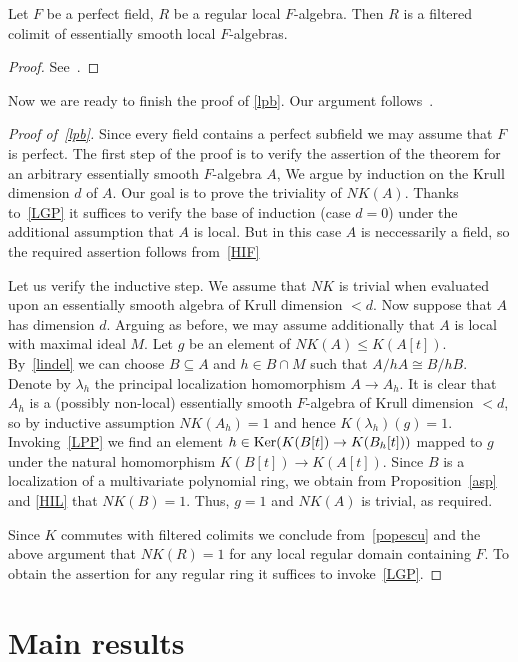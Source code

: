\documentclass[oneside, 11pt]{amsart} \pdfoutput=1
\begin{document}
\begin{theorem}[Popescu]
\label{popescu}
Let $F$ be a perfect field, $R$ be a regular local $F$-algebra. Then $R$ is a filtered colimit of essentially smooth local $F$-algebras.
\end{theorem}
\begin{proof} See~\cite[Corollary~1.3]{Sw98}.%
\end{proof}

Now we are ready to finish the proof of \cref{lpb}. Our argument follows~\cite{Sta14, Vo81}.
\begin{proof}[Proof of~\cref{lpb}]
Since every field contains a perfect subfield we may assume that $F$ is perfect.
The first step of the proof is to verify the assertion of the theorem for an arbitrary essentially smooth $F$-algebra $A$,  %
We argue by induction on the Krull dimension $d$ of $A$. Our goal is to prove the triviality of $NK(A)$.
Thanks to~\cref{LGP} it suffices to verify the base of induction (case $d=0$) under the additional assumption that $A$ is local.
But in this case $A$ is neccessarily a field, so the required assertion follows from~\ref{HIF}

Let us verify the inductive step. We assume that $NK$ is trivial when evaluated upon an essentially smooth algebra of Krull dimension $<d$. Now suppose that $A$ has dimension $d$. Arguing as before, we may assume additionally that $A$ is local with maximal ideal $M$.
Let $g$ be an element of $NK(A) \leq K(A[t])$. By~\cref{lindel} we can choose $B\subseteq A$ and $h\in B\cap M$ such that $A/hA \cong B/hB$. Denote by $\lambda_h$ the principal localization homomorphism $A \to A_h$. It is clear that $A_h$ is a (possibly non-local) essentially smooth $F$-algebra of Krull dimension $<d$, so by inductive assumption $NK(A_h) = 1$ and hence $K(\lambda_h)(g) = 1$. Invoking~\ref{LPP} we find an element $h \in \mathop{\mathrm{Ker}}\nolimits(K(B[t]) \to K(B_h[t]))$ mapped to $g$ under the natural homomorphism $K(B[t]) \to K(A[t])$.
Since $B$ is a localization of a multivariate polynomial ring, we obtain from Proposition~\ref{asp} and \cref{HIL} that $NK(B) = 1$. Thus, $g = 1$ and $NK(A)$ is trivial, as required.

Since $K$ commutes with filtered colimits we conclude from~\cref{popescu} and the above argument that $NK(R) = 1$ for any local regular domain containing $F$. To obtain the assertion for any regular ring it suffices to invoke~\cref{LGP}.
\end{proof}

\section{Main results}\label{sec:main}
\end{document}
